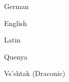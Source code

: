 \makeatletter

\newcommand{\FDISetLanguageFonts}[2]{%
  \expandafter\def\csname FDIfonts@#1\endcsname{#2}%
}

\newcommand{\FDISetupLanguageFonts}{%
  \let\KarolingischeMinuskel\FDIKarolingischeMinuskelDefault
  \let\FDIOverlayFont\FDIOverlayFontDefault
  \let\ArialBOLDFont\FDIArialBOLDFontDefault
  \let\ArialFont\FDIArialFontDefault
  \@ifundefined{FDIfonts@\FDILanguage}{%
    \typeout{FDI: Language \FDILanguage\space uses the default FDI font macros.}%
  }{%
    \typeout{FDI: Language \FDILanguage\space switches FDI font macros only.}%
    \csname FDIfonts@\FDILanguage\endcsname
  }%
}

\makeatother


\newcommand{\FDILanguageFolder}{%
  language_files/\FDILanguage%
}

\newcommand{\FDILanguageFontFolder}{%
  \FDILanguageFolder/fonts_\FDILanguage%
}


\newcommand{\FDILanguageList}{deu,eng,vss}

\makeatletter

\newcommand{\FDISetLanguageName}[2]{%
  \expandafter\def\csname FDIlangname@#1\endcsname{#2}%
}

\newcommand{\FDILanguageName}[1]{%
  \@ifundefined{FDIlangname@#1}{#1}{\csname FDIlangname@#1\endcsname}%
}

\FDISetLanguageName{deu}{German}
\FDISetLanguageName{eng}{English}
\FDISetLanguageName{lat}{Latin}
\FDISetLanguageName{qya}{Quenya}
\FDISetLanguageName{vss}{Vs'shtak (Draconic)}

